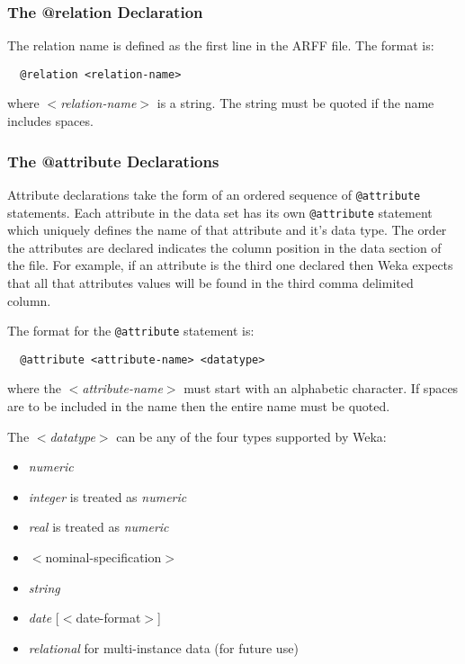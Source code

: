 \subsubsection*{The @relation Declaration}
The relation name is defined as the first line in the ARFF file. The format is:

\begin{verbatim}
  @relation <relation-name>
\end{verbatim}

where \textit{$<$relation-name$>$} is a string. The string must be quoted if the name includes spaces.


\subsubsection*{The @attribute Declarations}
Attribute declarations take the form of an ordered sequence of \texttt{@attribute} statements. Each attribute in the data set has its own \texttt{@attribute} statement which uniquely defines the name of that attribute and it's data type. The order the attributes are declared indicates the column position in the data section of the file. For example, if an attribute is the third one declared then Weka expects that all that attributes values will be found in the third comma delimited column.

The format for the \texttt{@attribute} statement is:

\begin{verbatim}
  @attribute <attribute-name> <datatype>
\end{verbatim}

where the \textit{$<$attribute-name$>$} must start with an alphabetic character. If spaces are to be included in the name then the entire name must be quoted.

The \textit{$<$datatype$>$} can be any of the four types supported by Weka:
\begin{itemize}
	\item \textit{numeric}
	\item \textit{integer} is treated as \textit{numeric}
	\item \textit{real} is treated as \textit{numeric}
	\item $<$nominal-specification$>$
	\item \textit{string}
	\item \textit{date} [$<$date-format$>$]
	\item \textit{relational} for multi-instance data (for future use)
\end{itemize}

